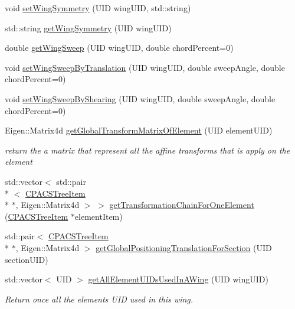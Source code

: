 \begin{DoxyCompactItemize}
\item 
void \hyperlink{classcpcr_1_1AircraftTree_ad475604a92a2c9e4ad80f5b66a6bb852}{set\-Wing\-Symmetry} (U\-I\-D wing\-U\-I\-D, std\-::string)
\item 
std\-::string \hyperlink{classcpcr_1_1AircraftTree_a74e4ffc6b8581c9e9748cbec556b6fcc}{get\-Wing\-Symmetry} (U\-I\-D wing\-U\-I\-D)
\item 
double \hyperlink{classcpcr_1_1AircraftTree_aba201a5d66774e64cbaa7870087a73e1}{get\-Wing\-Sweep} (U\-I\-D wing\-U\-I\-D, double chord\-Percent=0)
\item 
void \hyperlink{classcpcr_1_1AircraftTree_ae7714bafa64d35000a0cfd299b4f954e}{set\-Wing\-Sweep\-By\-Translation} (U\-I\-D wing\-U\-I\-D, double sweep\-Angle, double chord\-Percent=0)
\item 
void \hyperlink{classcpcr_1_1AircraftTree_a4c2adb1082e02f7390a281c44868de8f}{set\-Wing\-Sweep\-By\-Shearing} (U\-I\-D wing\-U\-I\-D, double sweep\-Angle, double chord\-Percent=0)
\item 
Eigen\-::\-Matrix4d \hyperlink{classcpcr_1_1AircraftTree_a2404c22f8b1570b2600691506c60a965}{get\-Global\-Transform\-Matrix\-Of\-Element} (U\-I\-D element\-U\-I\-D)
\begin{DoxyCompactList}\small\item\em return the a matrix that represent all the affine transforms that is apply on the element \end{DoxyCompactList}\item 
std\-::vector$<$ std\-::pair\\*
$<$ \hyperlink{classcpcr_1_1CPACSTreeItem}{C\-P\-A\-C\-S\-Tree\-Item} \\*
$\ast$, Eigen\-::\-Matrix4d $>$ $>$ \hyperlink{classcpcr_1_1AircraftTree_ae9dc2df3ae532e7b6fe3124ba7d62ce0}{get\-Transformation\-Chain\-For\-One\-Element} (\hyperlink{classcpcr_1_1CPACSTreeItem}{C\-P\-A\-C\-S\-Tree\-Item} $\ast$element\-Item)
\item 
std\-::pair$<$ \hyperlink{classcpcr_1_1CPACSTreeItem}{C\-P\-A\-C\-S\-Tree\-Item} \\*
$\ast$, Eigen\-::\-Matrix4d $>$ \hyperlink{classcpcr_1_1AircraftTree_ae8b6aa1e5a1cee897160d54c596f9aba}{get\-Global\-Positioning\-Translation\-For\-Section} (U\-I\-D section\-U\-I\-D)
\item 
std\-::vector$<$ U\-I\-D $>$ \hyperlink{classcpcr_1_1AircraftTree_a53ffa4032bae96478332cba4fcce7710}{get\-All\-Element\-U\-I\-Ds\-Used\-In\-A\-Wing} (U\-I\-D wing\-U\-I\-D)
\begin{DoxyCompactList}\small\item\em Return once all the elements U\-I\-D used in this wing. \end{DoxyCompactList}\item 

\end{DoxyCompactItemize}
